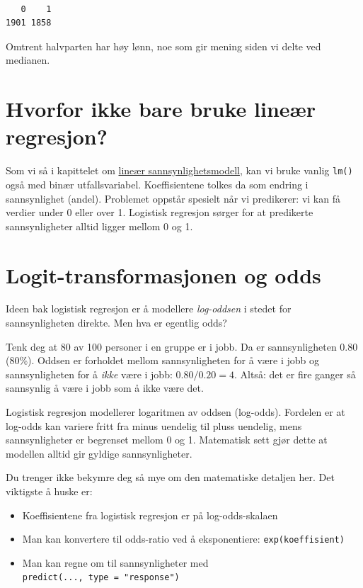 \documentclass[
  norsk,
  letterpaper,
  DIV=11,
  numbers=noendperiod]{scrreprt}
\providecommand{\tightlist}{%
  \setlength{\itemsep}{0pt}\setlength{\parskip}{0pt}}
\theoremstyle{definition}
\theoremstyle{remark}
\begin{document}
\begin{verbatim}

   0    1 
1901 1858 
\end{verbatim}

Omtrent halvparten har høy lønn, noe som gir mening siden vi delte ved
medianen.

\section{Hvorfor ikke bare bruke lineær
regresjon?}\label{hvorfor-ikke-bare-bruke-lineuxe6r-regresjon}

Som vi så i kapittelet om
\hyperref[lineuxe6r-sannsynlighetsmodell]{lineær sannsynlighetsmodell},
kan vi bruke vanlig \texttt{lm()} også med binær utfallsvariabel.
Koeffisientene tolkes da som endring i sannsynlighet (andel). Problemet
oppstår spesielt når vi predikerer: vi kan få verdier under 0 eller over
1. Logistisk regresjon sørger for at predikerte sannsynligheter alltid
ligger mellom 0 og 1.

\section{Logit-transformasjonen og
odds}\label{logit-transformasjonen-og-odds}

Ideen bak logistisk regresjon er å modellere \emph{log-oddsen} i stedet
for sannsynligheten direkte. Men hva er egentlig odds?

Tenk deg at 80 av 100 personer i en gruppe er i jobb. Da er
sannsynligheten 0.80 (80\%). Oddsen er forholdet mellom sannsynligheten
for å være i jobb og sannsynligheten for å \emph{ikke} være i jobb:
\(0.80 / 0.20 = 4\). Altså: det er fire ganger så sannsynlig å være i
jobb som å ikke være det.

Logistisk regresjon modellerer logaritmen av oddsen (log-odds). Fordelen
er at log-odds kan variere fritt fra minus uendelig til pluss uendelig,
mens sannsynligheter er begrenset mellom 0 og 1. Matematisk sett gjør
dette at modellen alltid gir gyldige sannsynligheter.

Du trenger ikke bekymre deg så mye om den matematiske detaljen her. Det
viktigste å huske er:

\begin{itemize}
\tightlist
\item
  Koeffisientene fra logistisk regresjon er på log-odds-skalaen
\item
  Man kan konvertere til odds-ratio ved å eksponentiere:
  \texttt{exp(koeffisient)}
\item
  Man kan regne om til sannsynligheter med
  \texttt{predict(...,\ type\ =\ "response")}
\end{itemize}
\end{document}
